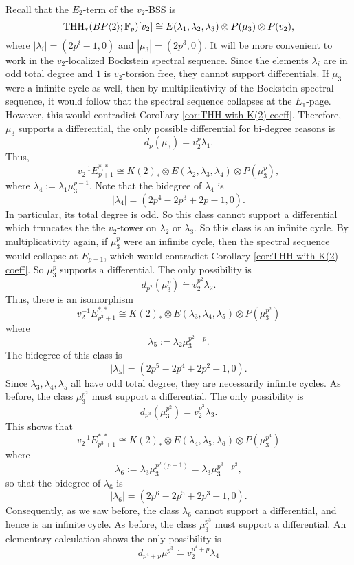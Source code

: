 Recall that the $E_2$-term of the $v_2$-BSS is 
\[
\operatorname{THH}_*(BP\langle 2 \rangle;\mathbb{F}_p)[v_2]\cong E(\lambda_1,\lambda_2,\lambda_3)\otimes P(\mu_3)\otimes P(v_2),
\]
where
$
|\lambda_i| = (2p^i-1, 0)
$
and 
$
|\mu_3|=(2p^3,0).
$
It will be more convenient to work in the $v_2$-localized Bockstein spectral sequence. Since the elements $\lambda_i$ are in odd total degree and $1$ is $v_2$-torsion free, they cannot support differentials. If $\mu_3$ were a infinite cycle as well, then by multiplicativity of the Bockstein spectral sequence, it would follow that the spectral sequence collapses at the $E_1$-page. However, this would contradict Corollary \ref{cor:THH with K(2) coeff}. Therefore, $\mu_3$ supports a differential, the only possible differential for bi-degree reasons is 
\[
d_p(\mu_3)\dot{=}v_2^p\lambda_1.
\]
Thus, 
\[
v_2^{-1}E_{p+1}^{*,*}\cong K(2)_*\otimes E(\lambda_2, \lambda_3, \lambda_4)\otimes P(\mu_3^{p}),
\]
where $\lambda_4:=\lambda_1\mu_3^{p-1}$. Note that the bidegree of $\lambda_4$ is
\[
|\lambda_4| = (2p^4-2p^3+2p-1,0).
\]
In particular, its total degree is odd. So this class cannot support a differential which truncates the the $v_2$-tower on $\lambda_2$ or $\lambda_3$. So this class is an infinite cycle. By multiplicativity again, if $\mu_3^p$ were an infinite cycle, then the spectral sequence would collapse at $E_{p+1}$, which would contradict Corollary \ref{cor:THH with K(2) coeff}. So $\mu_3^p$ supports a differential. The only possibility is 
\[
d_{p^2}(\mu_3^p) \dot{=} v_2^{p^2}\lambda_2.
\]  
Thus, there is an isomorphism
\[
v_2^{-1}E_{p^2+1}^{*,*}\cong K(2)_*\otimes E(\lambda_3, \lambda_4, \lambda_5)\otimes P(\mu_3^{p^2})
\]
where 
\[
\lambda_5:= \lambda_2\mu_3^{p^2-p}.
\]
The bidegree of this class is 
\[
|\lambda_5| = (2p^5-2p^4+2p^2-1,0).
\]
Since $\lambda_3, \lambda_4, \lambda_5$ all have odd total degree, they are necessarily infinite cycles. As before, the class $\mu_3^{p^2}$ must support a differential. The only possibility is 
\[
d_{p^3}(\mu_3^{p^2})\dot{=}v_2^{p^3}\lambda_3.
\]
This shows that 
\[
v_2^{-1}E_{p^3+1}^{*,*}\cong K(2)_*\otimes E(\lambda_4,\lambda_5, \lambda_6)\otimes P(\mu_3^{p^4})
\]
where
\[
\lambda_6:= \lambda_3\mu_3^{p^2(p-1)} = \lambda_3\mu_3^{p^3-p^2},
\]
so that the bidegree of $\lambda_6$ is 
\[
|\lambda_6|=(2p^6-2p^5+2p^3-1,0).
\]
Consequently, as we saw before, the class $\lambda_6$ cannot support a differential, and hence is an infinite cycle. As before, the class $\mu_3^{p^3}$ must support a differential. An elementary calculation shows the only possibility is 
\[
d_{p^4+p}\mu^{p^3}\dot{=} v_2^{p^4+p}\lambda_4
\]

